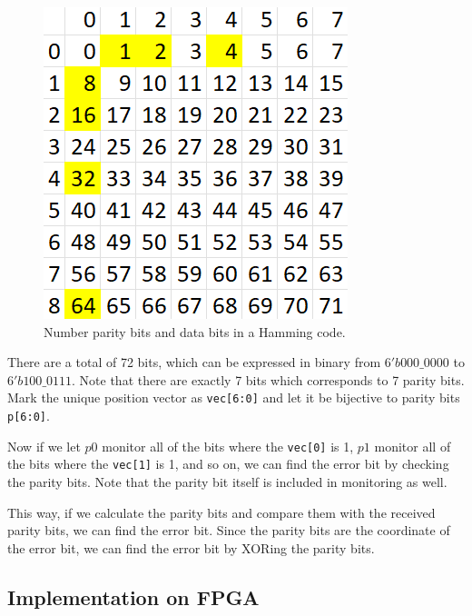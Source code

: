 \documentclass[conference]{IEEEtran}
\begin{document}
\begin{figure}[htbp]
  \centerline{\includegraphics{Images/Hamming_bits_order.png}}
  \caption{Number parity bits and data bits in a Hamming code.}
  \label{fig_3}
\end{figure}

There are a total of 72 bits, which can be expressed in binary from
$6'b000\_0000$ to $6'b 100\_0111$. Note that there are exactly 7 bits which
corresponds to 7 parity bits. Mark the unique position vector as
\texttt{vec[6:0]} and let it be bijective to parity bits \texttt{p[6:0]}.

Now if we let $p0$ monitor all of the bits where the \texttt{vec[0]} is 1, $p1$
monitor all of the bits where the \texttt{vec[1]} is 1, and so on, we can find
the error bit by checking the parity bits. Note that the parity bit itself is
included in monitoring as well.

This way, if we calculate the parity bits and compare them with the received
parity bits, we can find the error bit. Since the parity bits are the
coordinate of the error bit, we can find the error bit by XORing the parity
bits.

\subsection{Implementation on FPGA}
\end{document}
